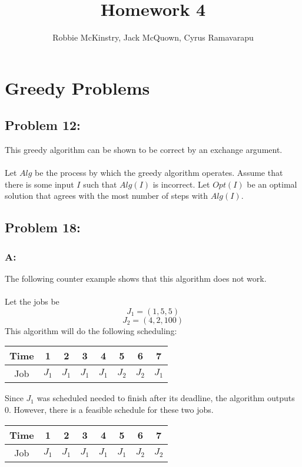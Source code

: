 \documentclass[12pt]{article}
\begin{document}
\title{Homework 4}
\author{Robbie McKinstry, Jack McQuown, Cyrus Ramavarapu}
\renewcommand{\today}{9 September 2016}
\renewcommand{\baselinestretch}{1.5}

\maketitle

\section*{Greedy Problems}
\subsection*{Problem 12:}
This greedy algorithm can be shown to be correct by an exchange argument.\\\\
Let $Alg$ be the process by which the greedy algorithm operates.  Assume that
there is some input $I$ such that $Alg(I)$ is incorrect. Let $Opt(I)$ be an
optimal solution that agrees with the most number of steps with $Alg(I)$.

\subsection*{Problem 18:}
\subsubsection*{A:}
The following counter example shows that this algorithm does not work.\\\\
Let the jobs be
\[
J_1=(1,5,5)
\]
\[
J_2=(4,2,100)
\]
This algorithm will do the following scheduling:\\
\begin{center}
    \begin{tabular}{c|c|c|c|c|c|c|c}
    Time & 1 & 2 & 3 & 4 & 5 & 6 & 7 \\ \hline
    Job & $J_1$ & $J_1$ & $J_1$ & $J_1$ & $J_2$ & $J_2$ & $J_1$ \\
    \end{tabular}
\end{center}  
Since $J_1$ was scheduled needed to finish after its deadline, the algorithm
outputs $0$.  However, there is a feasible schedule for these two jobs.\\
\begin{center}
    \begin{tabular}{c|c|c|c|c|c|c|c}
    Time & 1 & 2 & 3 & 4 & 5 & 6 & 7 \\ \hline
    Job & $J_1$ & $J_1$ & $J_1$ & $J_1$ & $J_1$ & $J_2$ & $J_2$ \\
    \end{tabular}
\end{center}  
\end{document}
